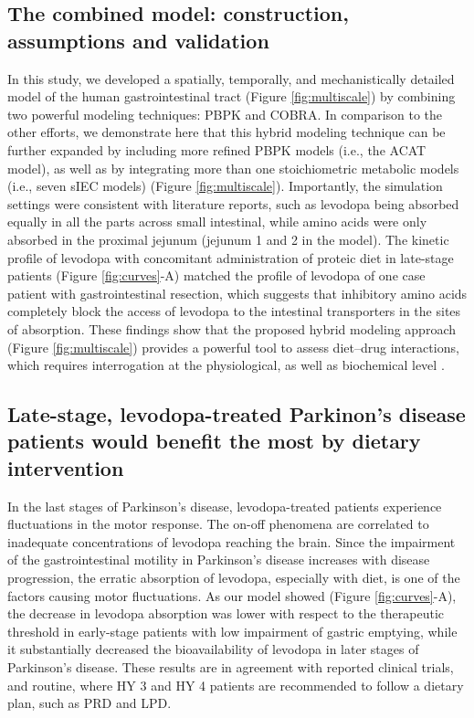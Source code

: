 \subsection{The combined model: construction, assumptions and validation}
In this study, we developed a spatially, temporally, and mechanistically detailed model of the human gastrointestinal tract  (Figure \ref{fig:multiscale}) by combining two powerful modeling techniques: PBPK and COBRA. In comparison to the other efforts\cite{krauss2012integrating}, we demonstrate here that this hybrid modeling technique can be further expanded by including more refined PBPK models (i.e., the ACAT model), as well as by integrating more than one stoichiometric metabolic models (i.e., seven sIEC models)  (Figure \ref{fig:multiscale}). Importantly, the simulation settings were consistent with literature reports, such as levodopa being absorbed equally in all the parts across small intestinal\cite{lennernas1993effect}, while amino acids were only absorbed in the proximal jejunum (jejunum 1 and 2 in the model)\cite{adibi1967kinetics}. The kinetic profile of levodopa with concomitant administration of proteic diet in late-stage patients (Figure \ref{fig:curves}-A) matched the profile of levodopa of one case patient with gastrointestinal resection\cite{nagayama2015pharmacokinetics}, which suggests that inhibitory amino
acids completely block the access of levodopa to the intestinal transporters in the sites of absorption. These findings show that the proposed hybrid modeling approach  (Figure \ref{fig:multiscale}) provides a powerful tool to assess diet–drug interactions, which requires interrogation at the physiological, as well as biochemical level \cite{van2011systems}.
\subsection{Late-stage, levodopa-treated Parkinon's disease patients would benefit the most by dietary intervention}
In the last stages of Parkinson's disease, levodopa-treated patients experience fluctuations in the motor response\cite{contin2001levodopa}. The on-off phenomena are correlated to inadequate concentrations of levodopa reaching the brain. Since the impairment of the gastrointestinal motility in Parkinson's disease \cite{fasano2015gastrointestinal} increases with disease progression, the erratic absorption of levodopa, especially with diet, is one of the factors causing motor fluctuations. As our model showed (Figure \ref{fig:curves}-A), the decrease in levodopa absorption was lower with respect to the therapeutic threshold in early-stage patients with low impairment of gastric emptying, while it substantially decreased the bioavailability of levodopa in later stages of Parkinson's disease. These results are in agreement with reported clinical trials\cite{contin2001levodopa}, and routine, where HY 3 and HY 4 patients are recommended to follow a dietary plan, such as PRD and LPD.
